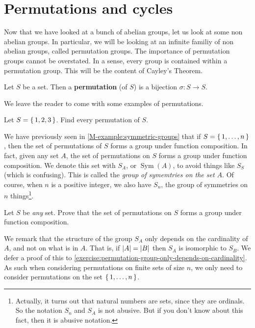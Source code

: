 \documentclass[./main.tex]{subfiles}
\begin{document}
\section{Permutations and cycles}
Now that we have looked at a bunch of abelian groups, let us look at some non
abelian groups. In particular, we will be looking at an infinite familiy of non
abelian groups, called permutation groups. The importance of permutation groups
cannot be overstated. In a sense, every group is contained within a permutation
group. This will be the content of Cayley's Theorem. 

\begin{definition}[Permutation]
\label{def:permutation}
    Let $S$ be a set. Then a \textbf{permutation} (of $S$) is a bijection
    $\sigma: S \to S$.
\end{definition}
We leave the reader to come with some examples of permutations. 
\begin{exercise}
    Let $S = \set{1,2,3}$. Find every permutation of $S$.
\end{exercise}

We have previously seen in \cref{M-example:symmetric-groups} that if $S =
\set{1,\dots,n}$, then the set of permutations of $S$ forms a group under
function composition. In fact, given any set $A$, the set of permutations on $S$
forms a group under function composition. We denote this set with $S_A$, or
$\operatorname{Sym}(A)$, to avoid things like $S_S$ (which is confusing). This
is called the \emph{group of symemtries on the set $A$}. Of course, when $n$ is
a positive integer, we also have $S_n$, the group of symmetries on $n$
things\footnote{Actually, it turns out that natural numbers are sets, since they
are ordinals. So the notation $S_n$ and $S_A$ is not abusive. But if you don't
know about this fact, then it is abusive notation.}.

\begin{exercise}
    Let $S$ be \emph{any} set. Prove that the set of permutations on $S$ forms a
    group under function composition.
\end{exercise}
We remark that the structure of the group $S_A$ only depends on the cardinality
of $A$, and not on what is in $A$. That is, if $\abs{A} = \abs{B}$ then $S_A$ is
isomorphic to $S_B$. We defer a proof of this to
\cref{exercise:permutation-group-only-depends-on-cardinality}. As such when
considering permutations on finite sets of size $n$, we only need to consider
permutations on the set $\set{1, \dots, n}$.
\end{document}
